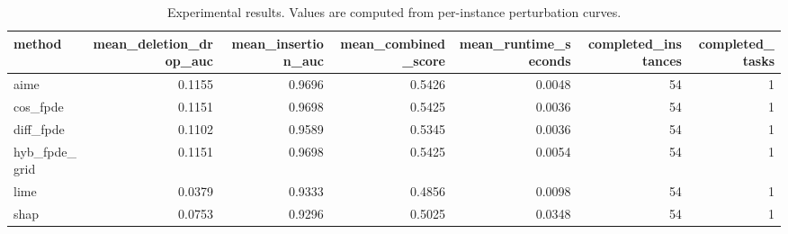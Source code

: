 \begin{table}[t]
\caption{Experimental results. Values are computed from per-instance perturbation curves.}
\label{tab:main_results_computed}
\centering
\begin{tabular}{lrrrrrr}
\toprule
method & mean\_deletion\_drop\_auc & mean\_insertion\_auc & mean\_combined\_score & mean\_runtime\_seconds & completed\_instances & completed\_tasks \\
\midrule
aime & 0.1155 & 0.9696 & 0.5426 & 0.0048 & 54 & 1 \\
cos\_fpde & 0.1151 & 0.9698 & 0.5425 & 0.0036 & 54 & 1 \\
diff\_fpde & 0.1102 & 0.9589 & 0.5345 & 0.0036 & 54 & 1 \\
hyb\_fpde\_grid & 0.1151 & 0.9698 & 0.5425 & 0.0054 & 54 & 1 \\
lime & 0.0379 & 0.9333 & 0.4856 & 0.0098 & 54 & 1 \\
shap & 0.0753 & 0.9296 & 0.5025 & 0.0348 & 54 & 1 \\
\bottomrule
\end{tabular}

\end{table}
